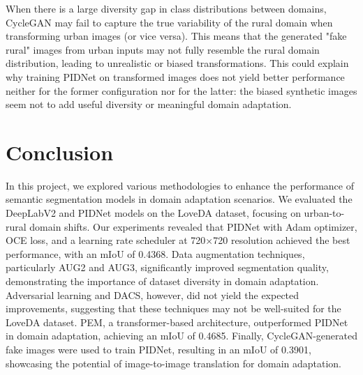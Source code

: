 \documentclass[10pt,twocolumn,letterpaper]{article}
\begin{document}
\clearpage

When there is a large diversity gap in class distributions between domains, CycleGAN may fail to capture the true variability of the rural domain when transforming urban images (or vice versa). This means that the generated "fake rural" images from urban inputs may not fully resemble the rural domain distribution, leading to unrealistic or biased transformations.
This could explain why training PIDNet on transformed images does not yield better performance neither for the former configuration nor for the latter: the biased synthetic images seem not to add useful diversity or meaningful domain adaptation.



\section{Conclusion}

In this project, we explored various methodologies to enhance the performance of semantic segmentation models in domain adaptation scenarios. We evaluated the DeepLabV2 and PIDNet models on the LoveDA dataset, focusing on urban-to-rural domain shifts. Our experiments revealed that PIDNet with Adam optimizer, OCE loss, and a learning rate scheduler at 720×720 resolution achieved the best performance, with an mIoU of 0.4368. Data augmentation techniques, particularly AUG2 and AUG3, significantly improved segmentation quality, demonstrating the importance of dataset diversity in domain adaptation. Adversarial learning and DACS, however, did not yield the expected improvements, suggesting that these techniques may not be well-suited for the LoveDA dataset. PEM, a transformer-based architecture, outperformed PIDNet in domain adaptation, achieving an mIoU of 0.4685. Finally, CycleGAN-generated fake images were used to train PIDNet, resulting in an mIoU of 0.3901, showcasing the potential of image-to-image translation for domain adaptation. 



\end{document}
